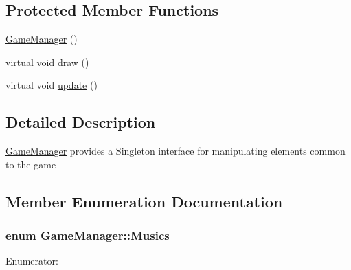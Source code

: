 \subsection*{Protected Member Functions}
\begin{DoxyCompactItemize}
\item 
\hyperlink{class_game_manager_aa0e2424dc1a39d380e5b6605b179bf05}{GameManager} ()
\item 
virtual void \hyperlink{class_game_manager_a4fa99153e63dc3419ba126af71188cfa}{draw} ()
\item 
virtual void \hyperlink{class_game_manager_a7ecc3a14cd9e92f50729b37d1364953f}{update} ()
\end{DoxyCompactItemize}


\subsection{Detailed Description}
\hyperlink{class_game_manager}{GameManager} provides a Singleton interface for manipulating elements common to the game 

\subsection{Member Enumeration Documentation}
\hypertarget{class_game_manager_a7fccedb9176b0430b47f50982a89a1d8}{
\subsubsection[{Musics}]{\setlength{\rightskip}{0pt plus 5cm}enum {\bf GameManager::Musics}}}
\label{db/d10/class_game_manager_a7fccedb9176b0430b47f50982a89a1d8}
\begin{Desc}
\item[Enumerator: ]\par
\begin{description}
\item[{\em 
\hypertarget{class_game_manager_a7fccedb9176b0430b47f50982a89a1d8a69f8325e5dbc50689055a6bbf0cee788}{
STAGE\_\-1}
\label{db/d10/class_game_manager_a7fccedb9176b0430b47f50982a89a1d8a69f8325e5dbc50689055a6bbf0cee788}
}]\item[{\em 
\hypertarget{class_game_manager_a7fccedb9176b0430b47f50982a89a1d8a23cd0d54021a0734d4850c518d9cbba3}{
MUSIC\_\-VECTOR\_\-SIZE}
\label{db/d10/class_game_manager_a7fccedb9176b0430b47f50982a89a1d8a23cd0d54021a0734d4850c518d9cbba3}
}]\end{description}
\end{Desc}


